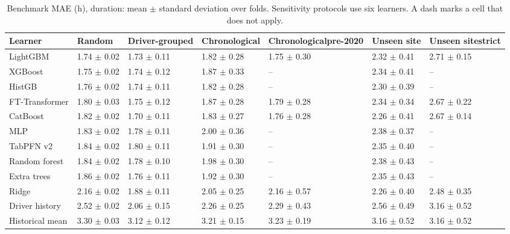 \begin{table}[H]\centering\scriptsize
\caption{Benchmark MAE (h), duration: mean $\pm$ standard deviation over folds. Sensitivity protocols use six learners. A dash marks a cell that does not apply.}\label{tab:s-bench-duration}
\begin{tabular}{lp{2.0cm}p{2.0cm}p{2.0cm}p{2.0cm}p{2.0cm}p{2.0cm}}\toprule
Learner & Random & Driver-grouped & Chronological & Chronological\newline pre-2020 & Unseen site & Unseen site\newline strict \\\midrule
LightGBM & 1.74 $\pm$ 0.02 & 1.73 $\pm$ 0.11 & 1.82 $\pm$ 0.28 & 1.75 $\pm$ 0.30 & 2.32 $\pm$ 0.41 & 2.71 $\pm$ 0.15 \\
XGBoost & 1.75 $\pm$ 0.02 & 1.74 $\pm$ 0.12 & 1.87 $\pm$ 0.33 & -- & 2.34 $\pm$ 0.41 & -- \\
HistGB & 1.76 $\pm$ 0.02 & 1.74 $\pm$ 0.11 & 1.82 $\pm$ 0.28 & -- & 2.30 $\pm$ 0.39 & -- \\
FT-Transformer & 1.80 $\pm$ 0.03 & 1.75 $\pm$ 0.12 & 1.87 $\pm$ 0.28 & 1.79 $\pm$ 0.28 & 2.34 $\pm$ 0.34 & 2.67 $\pm$ 0.22 \\
CatBoost & 1.82 $\pm$ 0.02 & 1.70 $\pm$ 0.11 & 1.83 $\pm$ 0.27 & 1.76 $\pm$ 0.28 & 2.26 $\pm$ 0.41 & 2.67 $\pm$ 0.14 \\
MLP & 1.83 $\pm$ 0.02 & 1.78 $\pm$ 0.11 & 2.00 $\pm$ 0.36 & -- & 2.38 $\pm$ 0.37 & -- \\
TabPFN v2 & 1.84 $\pm$ 0.02 & 1.80 $\pm$ 0.11 & 1.91 $\pm$ 0.30 & -- & 2.35 $\pm$ 0.40 & -- \\
Random forest & 1.84 $\pm$ 0.02 & 1.78 $\pm$ 0.10 & 1.98 $\pm$ 0.30 & -- & 2.38 $\pm$ 0.43 & -- \\
Extra trees & 1.86 $\pm$ 0.02 & 1.76 $\pm$ 0.11 & 1.92 $\pm$ 0.30 & -- & 2.35 $\pm$ 0.43 & -- \\
Ridge & 2.16 $\pm$ 0.02 & 1.88 $\pm$ 0.11 & 2.05 $\pm$ 0.25 & 2.16 $\pm$ 0.57 & 2.26 $\pm$ 0.40 & 2.48 $\pm$ 0.35 \\
Driver history & 2.52 $\pm$ 0.02 & 2.06 $\pm$ 0.15 & 2.26 $\pm$ 0.25 & 2.29 $\pm$ 0.43 & 2.56 $\pm$ 0.49 & 3.16 $\pm$ 0.52 \\
Historical mean & 3.30 $\pm$ 0.03 & 3.12 $\pm$ 0.12 & 3.21 $\pm$ 0.15 & 3.23 $\pm$ 0.19 & 3.16 $\pm$ 0.52 & 3.16 $\pm$ 0.52 \\
\bottomrule\end{tabular}\end{table}

